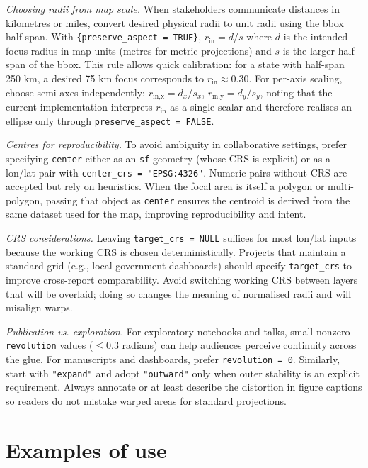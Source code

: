 \emph{Choosing radii from map scale.} When stakeholders communicate distances in kilometres or miles,
convert desired physical radii to unit radii using the bbox half-span. With \texttt{\{preserve\_aspect\ =\ TRUE\}}, \(r_{\text{in}} = d/s\) where \(d\) is the intended focus radius in map units (metres for
metric projections) and \(s\) is the larger half-span of the bbox. This rule allows quick calibration:
for a state with half-span 250 km, a desired 75 km focus corresponds to \(r_{\text{in}} \approx 0.30\).
For per-axis scaling, choose semi-axes independently: \(r_{\text{in,x}} = d_x/s_x\),
\(r_{\text{in,y}} = d_y/s_y\), noting that the current implementation interprets \(r_{\text{in}}\) as a
single scalar and therefore realises an ellipse only through \texttt{preserve\_aspect\ =\ FALSE}.

\emph{Centres for reproducibility.} To avoid ambiguity in collaborative settings, prefer specifying
\texttt{center} either as an \texttt{sf} geometry (whose CRS is explicit) or as a lon/lat pair with
\texttt{center\_crs\ =\ "EPSG:4326"}. Numeric pairs without CRS are accepted but rely on heuristics. When
the focal area is itself a polygon or multi-polygon, passing that object as \texttt{center} ensures the
centroid is derived from the same dataset used for the map, improving reproducibility and intent.

\emph{CRS considerations.} Leaving \texttt{target\_crs\ =\ NULL} suffices for most lon/lat inputs because
the working CRS is chosen deterministically. Projects that maintain a standard grid (e.g., local
government dashboards) should specify \texttt{target\_crs} to improve cross-report comparability. Avoid
switching working CRS between layers that will be overlaid; doing so changes the meaning of
normalised radii and will misalign warps.

\emph{Publication vs. exploration.} For exploratory notebooks and talks, small nonzero
\texttt{revolution} values (\(\le 0.3\) radians) can help audiences perceive continuity across the glue.
For manuscripts and dashboards, prefer \texttt{revolution\ =\ 0}. Similarly, start with \texttt{"expand"} and
adopt \texttt{"outward"} only when outer stability is an explicit requirement. Always annotate or at
least describe the distortion in figure captions so readers do not mistake warped areas for standard
projections.

\section{Examples of use}\label{examples-of-use}

